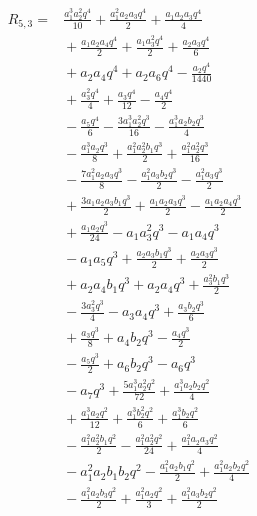 \begin{align*}
R_{5,3}={}& \frac{a_{1}^{3} a_{2}^{2} q^{4}}{10} + \frac{a_{1}^{2} a_{2} a_{3} q^{4}}{2} + \frac{a_{1} a_{2} a_{3} q^{4}}{4}\\
&{}+ \frac{a_{1} a_{2} a_{4} q^{4}}{2} + \frac{a_{1} a_{3}^{2} q^{4}}{2} + \frac{a_{2} a_{3} q^{4}}{6}\\
&{}+ a_{2} a_{4} q^{4} + a_{2} a_{6} q^{4} - \frac{a_{2} q^{4}}{1440}\\
&{}+ \frac{a_{3}^{2} q^{4}}{4} + \frac{a_{3} q^{4}}{12} - \frac{a_{4} q^{4}}{2}\\
&{}- \frac{a_{5} q^{4}}{6} - \frac{3 a_{1}^{3} a_{2}^{2} q^{3}}{16} - \frac{a_{1}^{3} a_{2} b_{2} q^{3}}{4}\\
&{}- \frac{a_{1}^{3} a_{2} q^{3}}{8} + \frac{a_{1}^{2} a_{2}^{2} b_{1} q^{3}}{2} + \frac{a_{1}^{2} a_{2}^{2} q^{3}}{16}\\
&{}- \frac{7 a_{1}^{2} a_{2} a_{3} q^{3}}{8} - \frac{a_{1}^{2} a_{3} b_{2} q^{3}}{2} - \frac{a_{1}^{2} a_{3} q^{3}}{2}\\
&{}+ \frac{3 a_{1} a_{2} a_{3} b_{1} q^{3}}{2} + \frac{a_{1} a_{2} a_{3} q^{3}}{2} - \frac{a_{1} a_{2} a_{4} q^{3}}{2}\\
&{}+ \frac{a_{1} a_{2} q^{3}}{24} - a_{1} a_{3}^{2} q^{3} - a_{1} a_{4} q^{3}\\
&{}- a_{1} a_{5} q^{3} + \frac{a_{2} a_{3} b_{1} q^{3}}{2} + \frac{a_{2} a_{3} q^{3}}{2}\\
&{}+ a_{2} a_{4} b_{1} q^{3} + a_{2} a_{4} q^{3} + \frac{a_{3}^{2} b_{1} q^{3}}{2}\\
&{}- \frac{3 a_{3}^{2} q^{3}}{4} - a_{3} a_{4} q^{3} + \frac{a_{3} b_{2} q^{3}}{6}\\
&{}+ \frac{a_{3} q^{3}}{8} + a_{4} b_{2} q^{3} - \frac{a_{4} q^{3}}{2}\\
&{}- \frac{a_{5} q^{3}}{2} + a_{6} b_{2} q^{3} - a_{6} q^{3}\\
&{}- a_{7} q^{3} + \frac{5 a_{1}^{3} a_{2}^{2} q^{2}}{72} + \frac{a_{1}^{3} a_{2} b_{2} q^{2}}{4}\\
&{}+ \frac{a_{1}^{3} a_{2} q^{2}}{12} + \frac{a_{1}^{3} b_{2}^{2} q^{2}}{6} + \frac{a_{1}^{3} b_{2} q^{2}}{6}\\
&{}- \frac{a_{1}^{2} a_{2}^{2} b_{1} q^{2}}{2} - \frac{a_{1}^{2} a_{2}^{2} q^{2}}{24} + \frac{a_{1}^{2} a_{2} a_{3} q^{2}}{4}\\
&{}- a_{1}^{2} a_{2} b_{1} b_{2} q^{2} - \frac{a_{1}^{2} a_{2} b_{1} q^{2}}{2} + \frac{a_{1}^{2} a_{2} b_{2} q^{2}}{4}\\
&{}- \frac{a_{1}^{2} a_{2} b_{3} q^{2}}{2} + \frac{a_{1}^{2} a_{2} q^{2}}{3} + \frac{a_{1}^{2} a_{3} b_{2} q^{2}}{2}\\

\end{align*}
